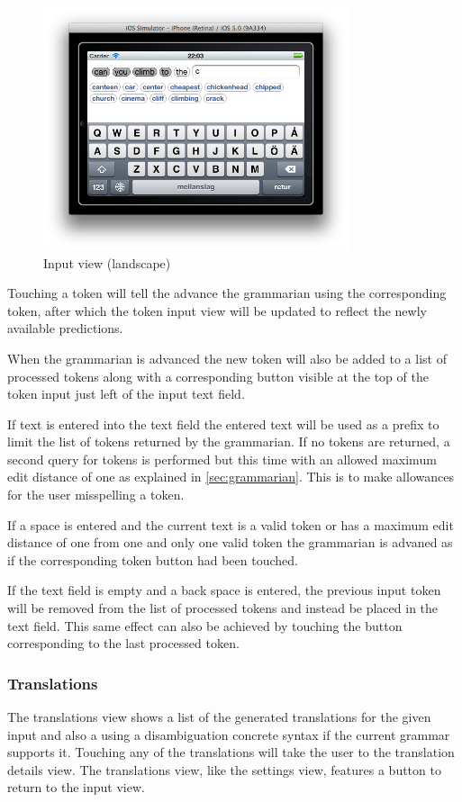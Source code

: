 \begin{figure}[htb]
\centering
\includegraphics[width=0.8\textwidth]{fig/inputview_landscape}
\caption{Input view (landscape)}
\label{fig:inputview_landscape}
\end{figure}

Touching a token will tell the advance the grammarian using the corresponding token, after which the token input view will be updated to reflect the newly available predictions.

When the grammarian is advanced the new token will also be added to a list of processed tokens along with a corresponding button visible at the top of the token input just left of the input text field.

If text is entered into the text field the entered text will be used as a prefix to limit the list of tokens returned by the grammarian. If no tokens are returned, a second query for tokens is performed but this time with an allowed maximum edit distance of one as explained in \ref{sec:grammarian}. This is to make allowances for the user misspelling a token.

If a space is entered and the current text is a valid token or has a maximum edit distance of one from one and only one valid token the grammarian is advaned as if the corresponding token button had been touched.

If the text field is empty and a back space is entered, the previous input token will be removed from the list of processed tokens and instead be placed in the text field. This same effect can also be achieved by touching the button corresponding to the last processed token.


\subsubsection{Translations}
The translations view shows a list of the generated translations for the given input and also a using a disambiguation concrete syntax if the current grammar supports it. Touching any of the translations will take the user to the translation details view. The translations view, like the settings view, features a button to return to the input view.


